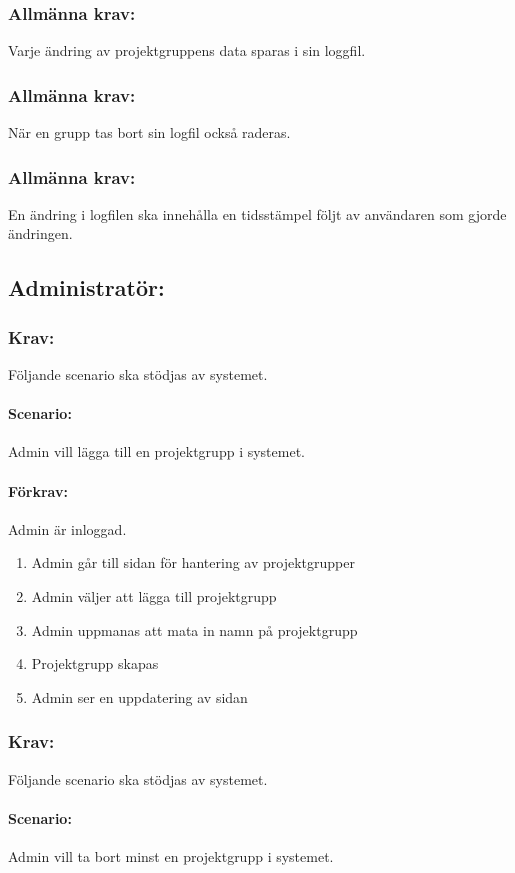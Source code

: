 \documentclass[paper=a4, fontsize=11pt,twoside]{article}
\begin{document}
\subsubsection{Allmänna krav:}
Varje ändring av projektgruppens data sparas i sin loggfil.
\subsubsection{Allmänna krav:}
När en grupp tas bort sin logfil också raderas.
\subsubsection{Allmänna krav:}
En ändring i logfilen ska innehålla en tidsstämpel följt av användaren som gjorde ändringen.

\subsection{Administratör:}

\subsubsection{Krav:} Följande scenario ska stödjas av systemet.
\paragraph{Scenario:}
Admin vill lägga till en projektgrupp i systemet.
\paragraph{Förkrav:}
Admin är inloggad.
\begin{enumerate}
\item Admin går till sidan för hantering av projektgrupper
\item Admin väljer att lägga till projektgrupp
\item Admin uppmanas att mata in namn på projektgrupp
\item Projektgrupp skapas
\item Admin ser en uppdatering av sidan
\end{enumerate}

\subsubsection{Krav:} 
Följande scenario ska stödjas av systemet.
\paragraph{Scenario:}
Admin vill ta bort minst en projektgrupp i systemet.
\end{document}
